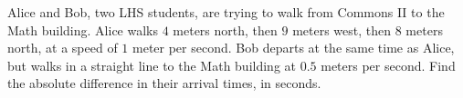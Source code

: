 Alice and Bob, two LHS students, are trying to walk from Commons II to the Math building. Alice walks $4$ meters north, then $9$ meters west, then $8$ meters north, at a speed of $1$ meter per second. Bob departs at the same time as Alice, but walks in a straight line to the Math building at $0.5$ meters per second. Find the absolute difference in their arrival times, in seconds.
